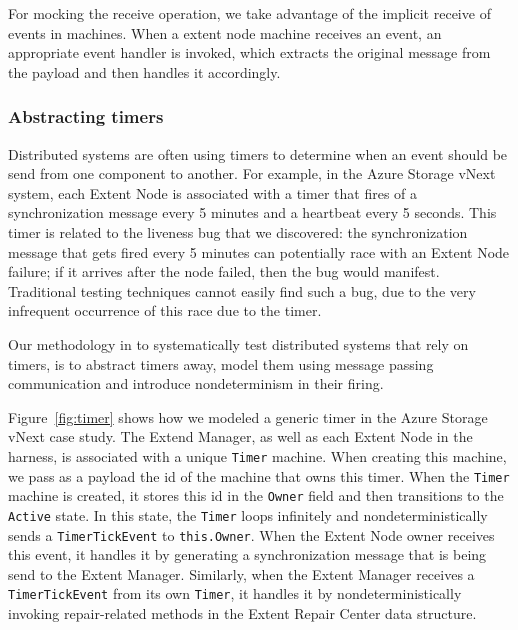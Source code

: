 For mocking the receive operation, we take advantage of the implicit receive of events in \psharp machines. When a extent node machine receives an event, an appropriate event handler is invoked, which extracts the original message from the payload and then handles it accordingly.

\subsubsection{Abstracting timers}
\label{sec:method:model:timers}

Distributed systems are often using timers to determine when an event should be send from one component to another. For example, in the Azure Storage vNext system, each Extent Node is associated with a timer that fires of a synchronization message every 5 minutes and a heartbeat every 5 seconds. This timer is related to the liveness bug that we discovered: the synchronization message that gets fired every 5 minutes can potentially race with an Extent Node failure; if it arrives after the node failed, then the bug would manifest. Traditional testing techniques cannot easily find such a bug, due to the very infrequent occurrence of this race due to the timer. 

Our methodology in \psharp to systematically test distributed systems that rely on timers, is to abstract timers away, model them using message passing communication and introduce nondeterminism in their firing.

Figure~\ref{fig:timer} shows how we modeled a generic timer in the Azure Storage vNext case study. The Extend Manager, as well as each Extent Node in the harness, is associated with a unique \texttt{Timer} machine. When creating this machine, we pass as a payload the id of the machine that owns this timer. When the \texttt{Timer} machine is created, it stores this id in the \texttt{Owner} field and then transitions to the \texttt{Active} state. In this state, the \texttt{Timer} loops infinitely and nondeterministically sends a \texttt{TimerTickEvent} to \texttt{this.Owner}. When the Extent Node owner receives this event, it handles it by generating a synchronization message that is being send to the Extent Manager. Similarly, when the Extent Manager receives a \texttt{TimerTickEvent} from its own \texttt{Timer}, it handles it by nondeterministically invoking repair-related methods in the Extent Repair Center data structure. 

